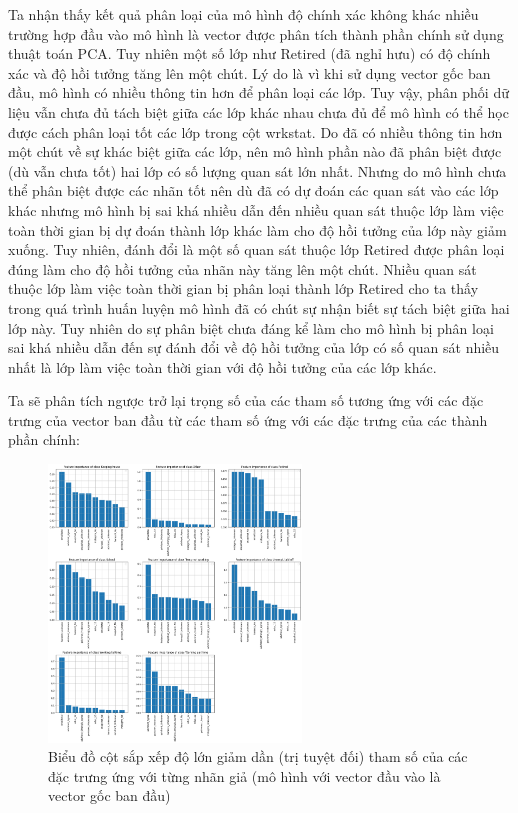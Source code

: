 \begin{enumerate}[label=(\alph*)]
    Ta nhận thấy kết quả phân loại của mô hình độ chính xác không khác nhiều trường hợp đầu vào mô hình là vector được phân tích thành phần chính sử dụng thuật toán PCA.
    Tuy nhiên một số lớp như Retired (đã nghỉ hưu) có độ chính xác và độ hồi tưởng tăng lên một chút.
    Lý do là vì khi sử dụng vector gốc ban đầu, mô hình có nhiều thông tin hơn để phân loại các lớp.
    Tuy vậy, phân phối dữ liệu vẫn chưa đủ tách biệt giữa các lớp khác nhau chưa đủ để mô hình có thể học được cách phân loại tốt các lớp trong cột wrkstat.
    Do đã có nhiều thông tin hơn một chút về sự khác biệt giữa các lớp, nên mô hình phần nào đã phân biệt được (dù vẫn chưa tốt) hai lớp có số lượng quan sát lớn nhất.
    Nhưng do mô hình chưa thể phân biệt được các nhãn tốt nên dù đã có dự đoán các quan sát vào các lớp khác nhưng mô hình bị sai khá nhiều dẫn đến nhiều quan sát thuộc lớp làm việc toàn thời gian bị dự đoán thành lớp khác làm cho độ hồi tưởng của lớp này giảm xuống.
    Tuy nhiên, đánh đổi là một số quan sát thuộc lớp Retired được phân loại đúng làm cho độ hồi tưởng của nhãn này tăng lên một chút.
    Nhiều quan sát thuộc lớp làm việc toàn thời gian bị phân loại thành lớp Retired cho ta thấy trong quá trình huấn luyện mô hình đã có chút sự nhận biết sự tách biệt giữa hai lớp này.
    Tuy nhiên do sự phân biệt chưa đáng kể làm cho mô hình bị phân loại sai khá nhiều dẫn đến sự đánh đổi về độ hồi tưởng của lớp có số quan sát nhiều nhất là lớp làm việc toàn thời gian với độ hồi tưởng của các lớp khác.

    Ta sẽ phân tích ngược trở lại trọng số của các tham số tương ứng với các đặc trưng của vector ban đầu từ các tham số ứng với các đặc trưng của các thành phần chính:

    \begin{figure}[H]
        \centering
        \includegraphics[width=0.6\textwidth]{figures/Thanh/Models/Logistic/Non_null_models_Feature_Importance_Logistic_PCA_features.png}
        \caption{Biểu đồ cột sắp xếp độ lớn giảm dần (trị tuyệt đối) tham số của các đặc trưng ứng với từng nhãn giả (mô hình với vector đầu vào là vector gốc ban đầu)}
        \label{fig:Non_null_models_Feature_Importance_Logistic_PCA_features}
    \end{figure}


\end{enumerate}
